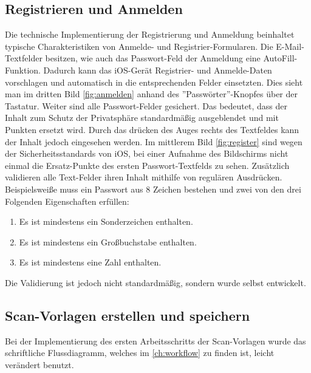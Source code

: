 \documentclass[notables, nomenclature, oneside, 150]{HSMW-Thesis}
\begin{document}
		\subsection{Registrieren und Anmelden}
			Die technische Implementierung der Registrierung und Anmeldung beinhaltet typische Charakteristiken von Anmelde- und Registrier-Formularen. Die E-Mail-Textfelder besitzen, wie auch das Passwort-Feld der Anmeldung eine AutoFill-Funktion. Dadurch kann das iOS-Gerät Registrier- und Anmelde-Daten vorschlagen und automatisch in die entsprechenden Felder einsetzten. Dies sieht man im dritten Bild \ref{fig:anmelden} anhand des ''Passwörter''-Knopfes über der Tastatur.  Weiter sind alle Passwort-Felder gesichert. Das bedeutet, dass der Inhalt zum Schutz der Privatsphäre standardmäßig ausgeblendet und mit Punkten ersetzt wird. Durch das drücken des Auges rechts des Textfeldes kann der Inhalt jedoch eingesehen werden. Im mittlerem Bild \ref{fig:register} sind wegen der Sicherheitsstandards von iOS, bei einer Aufnahme des Bildschirms nicht einmal die Ersatz-Punkte des ersten Passwort-Textfelds zu sehen. Zusätzlich validieren alle Text-Felder ihren Inhalt mithilfe von regulären Ausdrücken. Beispielsweiße muss ein Passwort aus 8 Zeichen bestehen und zwei von den drei Folgenden Eigenschaften erfüllen:
			\begin{enumerate}
				\item Es ist mindestens ein Sonderzeichen enthalten.
				\item Es ist mindestens ein Großbuchstabe enthalten.
				\item Es ist mindestens eine Zahl enthalten.
			\end{enumerate}
			Die Validierung ist jedoch nicht standardmäßig, sondern wurde selbst entwickelt.
			
		\subsection{Scan-Vorlagen erstellen und speichern}
			Bei der Implementierung des ersten Arbeitsschritts der Scan-Vorlagen wurde das schriftliche Flussdiagramm, welches im \autoref{ch:workflow} zu finden ist, leicht verändert benutzt.
			
\end{document}
